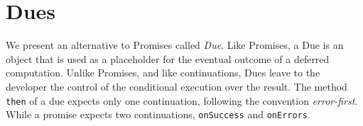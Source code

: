 


\section{Dues} \label{section:due}

We present an alternative to Promises called \textit{Due}.
Like Promises, a Due is an object that is used as a placeholder for the eventual outcome of a deferred computation.
Unlike Promises, and like continuations, Dues leave to the developer the control of the conditional execution over the result.
The method \texttt{then} of a due expects only one continuation, following the convention \textit{error-first}.
While a promise expects two continuations, \texttt{onSuccess} and \texttt{onErrors}. 

